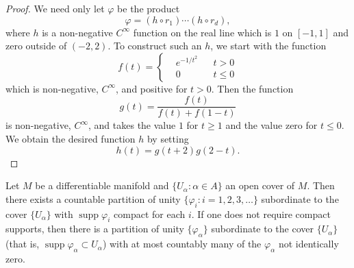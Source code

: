 \begin{proof}
	We need only let $\varphi$ be the product
	\begin{equation}
		\tag{1}\label{eq:1.10:1}
		\varphi=(h\circ r_{1})\cdots(h\circ r_{d}),
	\end{equation}
	where $h$ is a non-negative $C^{\infty}$ function on the real line which is $1$
	on $[-1,1]$ and zero outside of $(-2,2)$. To construct such an $h$, we
	start with the function
	\begin{equation}
		\tag{2}\label{eq:1.10:2}
		f(t)=\left\{\begin{aligned}{}&{{}e^{-1/t^{2}}}&{}&{{}t>0}\\ {}&{{}0}&{}&{{}t\leq0}\end{aligned}\right.
	\end{equation}
	which is non-negative, $C^{\infty}$, and positive for $t>0$. Then the function
	\begin{equation}
		\tag{3}\label{eq:1.10:3}
		g(t)=\frac{f(t)}{f(t)+f(1-t)}
	\end{equation}
	is non-negative, $C^\infty$, and takes the value $1$ for $t \geq 1$ and
	the value zero for $t \leq 0$. We obtain the desired function $h$ by setting
	\begin{equation}
		\tag{4}\label{eq:1.10:4}
		h(t)=g(t+2)g(2-t).
	\end{equation}
\end{proof}

\begin{theorem}\label{thm:1.11}
	Let $M$ be a differentiable manifold and
	$\{U_\alpha: \alpha \in A\}$ an open cover of $M$. Then there exists a
	countable partition of unity $\{\varphi_i: i = 1, 2, 3, \ldots\}$
	subordinate to the cover $\{U_\alpha\}$ with $\operatorname{supp} \varphi_i$
	compact for each $i$. If one does not require compact supports,
	then there is a partition of unity $\{\varphi_\alpha\}$ subordinate to
	the cover $\{U_\alpha\}$ (that is, $\operatorname{supp} \varphi_\alpha \subset U_\alpha$)
	with at most countably many of the $\varphi_\alpha$ not identically zero.

\end{theorem}

